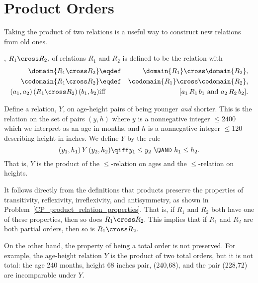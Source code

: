 \section{Product Orders}\label{prodsec}

Taking the product of two relations is a useful way to construct new
relations from old ones.

\begin{definition}\label{productrel}
, $R_1 \cross R_2$, of relations
$R_1$ and $R_2$ is defined to be the relation with
\begin{eqnarray*}
\domain{R_1 \cross R_2} &\eqdef& \domain{R_1} \cross \domain{R_2},\\
\codomain{R_1 \cross R_2} &\eqdef& \codomain{R_1} \cross \codomain{R_2},\\
(a_1,a_2)\, (R_1 \cross R_2)\, (b_1,b_2) &\text{iff}& [a_1\, R_1\, b_1
\text{ and } a_2\, R_2\, b_2].
\end{eqnarray*}

\end{definition}

\begin{example}\label{Y}
Define a relation, $Y$, on age-height pairs of being younger \emph{and}
shorter.  This is the relation on the set of pairs $(y,h)$ where $y$ is a
nonnegative integer $\le 2400$ which we interpret as an age in months, and $h$
is a nonnegative integer $\le 120$ describing height in inches.  We define $Y$
by the rule
\[
(y_1,h_1)\, Y\, (y_2,h_2) \qiff y_1 \le y_2\ \QAND\ h_1 \le h_2.
\]
That is, $Y$ is the product of the $\le$-relation on ages and the
$\le$-relation on heights.
\end{example}

It follows directly from the definitions that products preserve the
properties of transitivity, reflexivity, irreflexivity, and
antisymmetry, as shown in
Problem~\ref{CP_product_relation_properties}.  That is, if $R_1$ and
$R_2$ both have one of these properties, then so does $R_1 \cross
R_2$.  This implies that if $R_1$ and $R_2$ are both partial orders,
then so is $R_1 \cross R_2$.

On the other hand, the property of being a total order is not preserved.
For example, the age-height relation $Y$ is the product of two total
orders, but it is not total: the age 240 months, height 68 inches pair,
(240,68), and the pair (228,72) are incomparable under $Y$.

